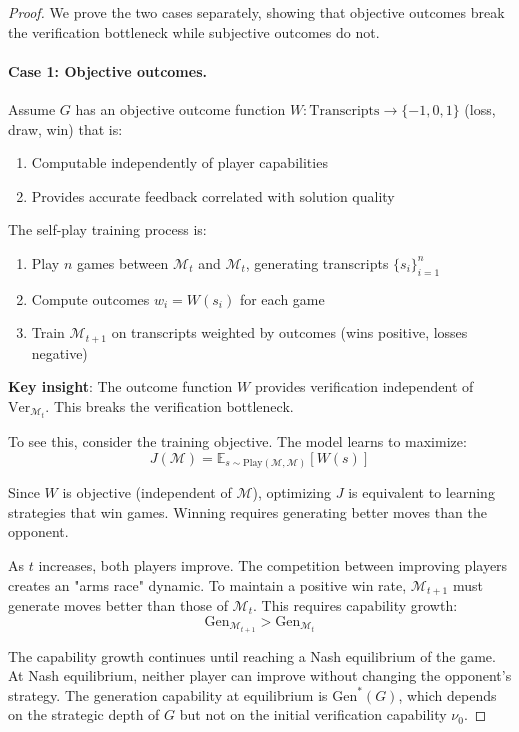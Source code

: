 \documentclass{article}
\theoremstyle{definition}
\theoremstyle{remark}
\newcommand{\M}{\mathcal{M}}
\newcommand{\Gen}{\text{Gen}}
\newcommand{\Ver}{\text{Ver}}
\newcommand{\E}{\mathbb{E}}
\begin{document}
\begin{proof}
We prove the two cases separately, showing that objective outcomes break the verification bottleneck while subjective outcomes do not.

\paragraph{Case 1: Objective outcomes.}
Assume \(G\) has an objective outcome function \(W : \text{Transcripts} \to \{-1, 0, 1\}\) (loss, draw, win) that is:
\begin{enumerate}
\item Computable independently of player capabilities
\item Provides accurate feedback correlated with solution quality
\end{enumerate}

The self-play training process is:
\begin{enumerate}
\item Play \(n\) games between \(\M_t\) and \(\M_t\), generating transcripts \(\{s_i\}_{i=1}^n\)
\item Compute outcomes \(w_i = W(s_i)\) for each game
\item Train \(\M_{t+1}\) on transcripts weighted by outcomes (wins positive, losses negative)
\end{enumerate}

\textbf{Key insight}: The outcome function \(W\) provides verification independent of \(\Ver_{\M_t}\). This breaks the verification bottleneck.

To see this, consider the training objective. The model learns to maximize:
\[
J(\M) = \E_{s \sim \text{Play}(\M, \M)}[W(s)]
\]

Since \(W\) is objective (independent of \(\M\)), optimizing \(J\) is equivalent to learning strategies that win games. Winning requires generating better moves than the opponent.

As \(t\) increases, both players improve. The competition between improving players creates an "arms race" dynamic. To maintain a positive win rate, \(\M_{t+1}\) must generate moves better than those of \(\M_t\). This requires capability growth:
\[
\Gen_{\M_{t+1}} > \Gen_{\M_t}
\]

The capability growth continues until reaching a Nash equilibrium of the game. At Nash equilibrium, neither player can improve without changing the opponent's strategy. The generation capability at equilibrium is \(\Gen^*(G)\), which depends on the strategic depth of \(G\) but not on the initial verification capability \(\nu_0\).


\end{proof}
\end{document}
